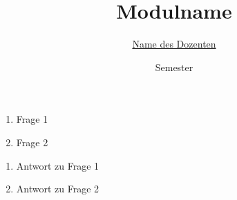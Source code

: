 


\title{Modulname}
\date{Semester}
\author{\href{mailto:name@adress}{Name des Dozenten}}


\newcommand{\sheetnumber}{1}
\newcommand{\publishdate}{09.10.2019}
\newcommand{\handindate}{16.10.2019, 10:00}
\setcounter{aufgabe}{0}




\begin{aufgabe}[subtitle={Tolle Aufgabe}]
  \begin{enumerate}
    \item Frage 1
    \item Frage 2
  \end{enumerate}
\end{aufgabe}

\begin{loesung}
  \begin{enumerate}
    \item Antwort zu Frage 1
    \item Antwort zu Frage 2
  \end{enumerate}
\end{loesung}



